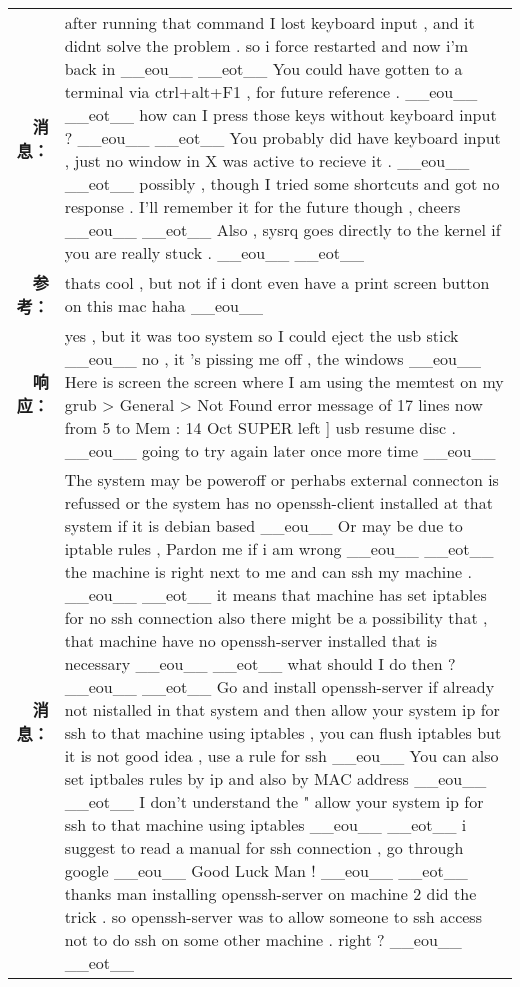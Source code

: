 \begin{tabularx}{\textwidth}{@{}rX@{}}%
\toprule%
\midrule%
\textbf{消息：}&after running that command I lost keyboard input , and it didnt solve the problem . so i force restarted and now i'm back in \_\_eou\_\_ \_\_eot\_\_ You could have gotten to a terminal via ctrl+alt+F1 , for future reference . \_\_eou\_\_ \_\_eot\_\_ how can I press those keys without keyboard input ? \_\_eou\_\_ \_\_eot\_\_ You probably did have keyboard input , just no window in X was active to recieve it . \_\_eou\_\_ \_\_eot\_\_ possibly , though I tried some shortcuts and got no response . I'll remember it for the future though , cheers \_\_eou\_\_ \_\_eot\_\_ Also , sysrq goes directly to the kernel if you are really stuck . \_\_eou\_\_ \_\_eot\_\_\\%
\textbf{参考：}&thats cool , but not if i dont even have a print screen button on this mac haha \_\_eou\_\_\\%
\textbf{响应：}&yes , but it was too system so I could eject the usb stick \_\_eou\_\_ no , it 's pissing me off , the windows \_\_eou\_\_ Here is screen the screen where I am using the memtest on my grub > General > Not Found error message of 17 lines now from 5 to Mem : 14 Oct SUPER left {]} usb resume disc . \_\_eou\_\_ going to try again later once more time \_\_eou\_\_\\%
\midrule%
\textbf{消息：}&The system may be poweroff or perhabs external connecton is refussed or the system has no openssh{-}client installed at that system if it is debian based \_\_eou\_\_ Or may be due to iptable rules , Pardon me if i am wrong \_\_eou\_\_ \_\_eot\_\_ the machine is right next to me and can ssh my machine . \_\_eou\_\_ \_\_eot\_\_ it means that machine has set iptables for no ssh connection also there might be a possibility that , that machine have no openssh{-}server installed that is necessary \_\_eou\_\_ \_\_eot\_\_ what should I do then ? \_\_eou\_\_ \_\_eot\_\_ Go and install openssh{-}server if already not nistalled in that system and then allow your system ip for ssh to that machine using iptables , you can flush iptables but it is not good idea , use a rule for ssh \_\_eou\_\_ You can also set iptbales rules by ip and also by MAC address \_\_eou\_\_ \_\_eot\_\_ I don't understand the " allow your system ip for ssh to that machine using iptables \_\_eou\_\_ \_\_eot\_\_ i suggest to read a manual for ssh connection , go through google \_\_eou\_\_ Good Luck Man ! \_\_eou\_\_ \_\_eot\_\_ thanks man installing openssh{-}server on machine 2 did the trick . so openssh{-}server was to allow someone to ssh access not to do ssh on some other machine . right ? \_\_eou\_\_ \_\_eot\_\_\\%

\end{tabularx}
